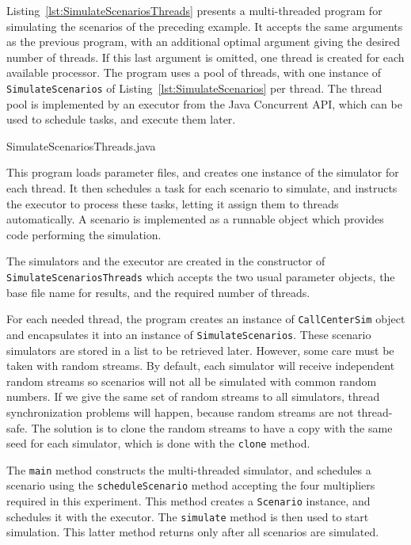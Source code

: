 Listing~\ref{lst:SimulateScenariosThreads} presents a multi-threaded
program for simulating the scenarios of the preceding example.
It accepts the same arguments as the previous program, with an
additional optimal argument giving the desired number of threads.
If this last argument is omitted, one thread is created for each
available processor.
The program uses a pool of threads, with
one instance of \texttt{Simulate\-Scenarios} of
Listing~\ref{lst:SimulateScenarios} per thread.
The thread pool is implemented by an executor from the Java Concurrent
API, which can be used to schedule tasks, and execute them later.


{SimulateScenariosThreads.java}

This program loads parameter files, and creates one instance of the
simulator for each thread.
It then schedules a task for each scenario to simulate, and instructs
the executor to process these tasks, letting it assign them to threads
automatically.
A scenario is implemented as a runnable object which provides code
performing the simulation.

The simulators
and the executor are created in the constructor of
\texttt{Simulate\-Scenarios\-Threads} which accepts the two usual
parameter objects, the base file name for results, and the required
number of threads.

For each needed thread, the program creates an instance of
\texttt{Call\-Center\-Sim} object and encapsulates it into an instance
of \texttt{Simulate\-Scenarios}.
These scenario simulators are stored in a list to be retrieved later.
However, some care must be taken with random streams.
By default, each simulator will receive independent random streams so
scenarios will not all be simulated with common random numbers.
If we give the same set of random streams to all simulators,
thread
synchronization problems will happen, because random streams are not
thread-safe.
The solution is to clone the random streams to have a copy with the
same seed for each simulator, which is done with the \texttt{clone}
method.

The \texttt{main} method constructs the multi-threaded simulator, and
schedules a scenario using the \texttt{schedule\-Scenario} method
accepting the four multipliers required in this experiment.
This method creates a \texttt{Scenario} instance, and schedules it
with the executor.
The \texttt{simulate} method is then used to start simulation.
This latter method returns only after all scenarios are simulated.

